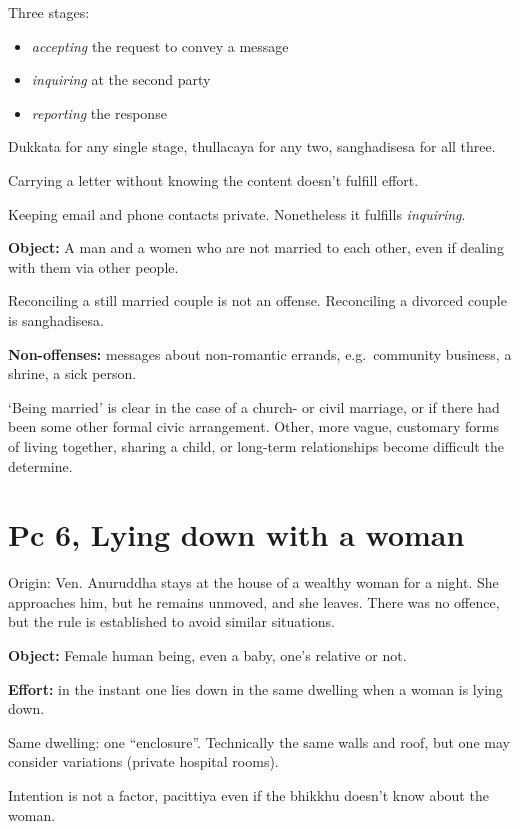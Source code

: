 Three stages:

\begin{itemize}
\tightlist
\item
  \emph{accepting} the request to convey a message
\item
  \emph{inquiring} at the second party
\item
  \emph{reporting} the response
\end{itemize}

Dukkata for any single stage, thullacaya for any two, sanghadisesa for
all three.

Carrying a letter without knowing the content doesn't fulfill effort.

Keeping email and phone contacts private. Nonetheless it fulfills
\emph{inquiring}.

\textbf{Object:} A man and a women who are not married to each other,
even if dealing with them via other people.

Reconciling a still married couple is not an offense. Reconciling a
divorced couple is sanghadisesa.

\enlargethispage{2\baselineskip}

\textbf{Non-offenses:} messages about non-romantic errands,
e.g.~community business, a shrine, a sick person.

`Being married' is clear in the case of a church- or civil marriage, or
if there had been some other formal civic arrangement. Other, more
vague, customary forms of living together, sharing a child, or long-term
relationships become difficult the determine.

\section{Pc 6, Lying down with a woman}

Origin: Ven. Anuruddha stays at the house of a wealthy woman for a
night. She approaches him, but he remains unmoved, and she leaves. There
was no offence, but the rule is established to avoid similar situations.

\textbf{Object:} Female human being, even a baby, one's relative or not.

\textbf{Effort:} in the instant one lies down in the same dwelling when
a woman is lying down.

Same dwelling: one ``enclosure''. Technically the same walls and roof,
but one may consider variations (private hospital rooms).

Intention is not a factor, pacittiya even if the bhikkhu doesn't know
about the woman.

